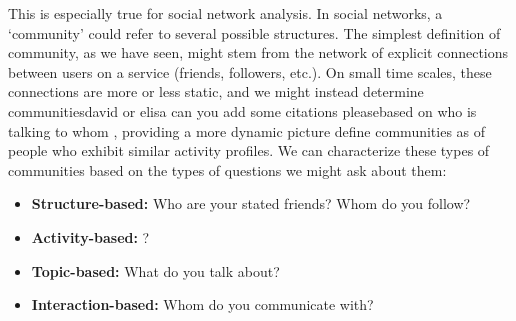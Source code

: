 This is especially true for social network analysis. In \DIFdelbegin {}\DIFdelend social networks, a `community' could refer to several possible structures. The simplest definition of community, as we have seen, might stem from the network of explicit connections between users on a service (friends, followers, etc.). On small time scales, these connections are more or less static, and we might instead determine communities\DIFaddbegin {}\alert{david or elisa can you add some citations please}\DIFadd{\mbox{%
\cite{}
}%
, }\DIFaddend based on who is talking to whom \DIFaddbegin {}\DIFaddend , providing a more dynamic picture \DIFdelbegin {}\DIFdelend \DIFaddbegin {}\DIFaddend define communities as \DIFdelbegin {}\DIFdelend \DIFaddbegin {}\DIFaddend of people who exhibit similar activity profiles\DIFdelbegin {}\DIFdelend . We can characterize these types of communities based on the types of questions we might ask about them:
\begin{itemize}
	\item \textbf{Structure-based:} Who are your stated friends? Whom do you follow?
	\item \textbf{Activity-based:} \DIFdelbegin {}\DIFdelend \DIFaddbegin {}\DIFaddend ?
	\item \textbf{Topic-based:} What do you talk about?
	\item \textbf{Interaction-based:} Whom do you communicate with?
\end{itemize}

